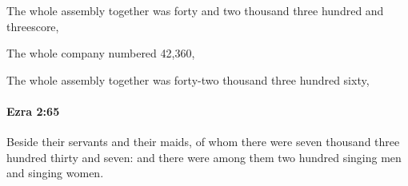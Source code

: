 			\begin{versebox}
					\item[BHS] 
					\item[LXX] 
					\item[ASV] The whole assembly together was forty and two thousand three hundred and threescore,
					\item[NIV] The whole company numbered 42,360,
					\item[NRSV] The whole assembly together was forty-two thousand three hundred sixty,
			\end{versebox}

		\paragraph{Ezra 2:65} %
			\label{EZRA-2-65}

			Beside their servants and their maids, of whom there were seven thousand three hundred thirty and seven: and there were among them two hundred singing men and singing women.

